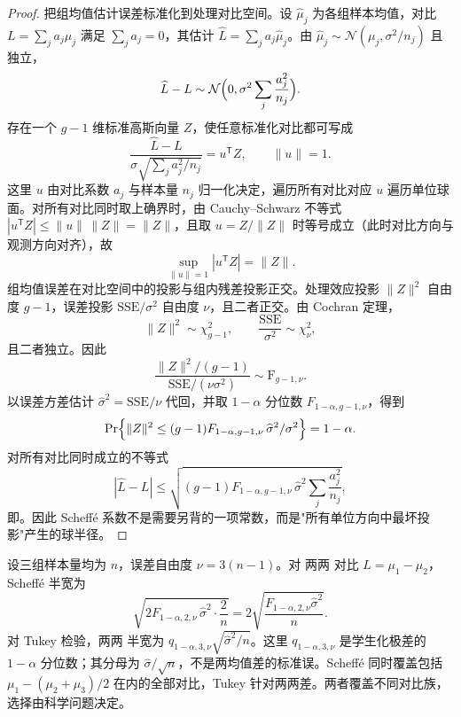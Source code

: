 \begin{proof}
把组均值估计误差标准化到处理对比空间。设 $\widehat\mu_j$ 为各组样本均值，对比 $L=\sum_ja_j\mu_j$ 满足 $\sum_ja_j=0$，其估计 $\widehat L=\sum_ja_j\widehat\mu_j$。由 $\widehat\mu_j\sim\mathcal N(\mu_j,\sigma^2/n_j)$ 且独立，
\begin{equation*}
\widehat L-L\sim\mathcal N\Bigl(0,\sigma^2\sum_j\frac{a_j^2}{n_j}\Bigr).
\end{equation*}
存在一个 $g-1$ 维标准高斯向量 $Z$，使任意标准化对比都可写成
\begin{equation*}
\frac{\widehat L-L}
{\sigma\sqrt{\sum_j a_j^2/n_j}}
=u^{\mathsf T}Z,
\qquad
\|u\|=1.
\end{equation*}
这里 $u$ 由对比系数 $a_j$ 与样本量 $n_j$ 归一化决定，遍历所有对比对应 $u$ 遍历单位球面。对所有对比同时取上确界时，由 Cauchy--Schwarz 不等式 $|u^{\mathsf T}Z|\le\|u\|\,\|Z\|=\|Z\|$，且取 $u=Z/\|Z\|$ 时等号成立（此时对比方向与观测方向对齐），故
\begin{equation*}
\sup_{\|u\|=1}|u^{\mathsf T}Z|
=\|Z\|.
\end{equation*}
组均值误差在对比空间中的投影与组内残差投影正交。处理效应投影 $\|Z\|^2$ 自由度 $g-1$，误差投影 $\mathrm{SSE}/\sigma^2$ 自由度 $\nu$，且二者正交。由 Cochran 定理，
\begin{equation*}
\|Z\|^2\sim\chi^2_{g-1},
\qquad
\frac{\mathrm{SSE}}{\sigma^2}\sim\chi^2_\nu,
\end{equation*}
且二者独立。因此
\begin{equation*}
\frac{\|Z\|^2/(g-1)}{\mathrm{SSE}/(\nu\sigma^2)}
\sim\mathrm F_{g-1,\nu}.
\end{equation*}
以误差方差估计 $\widehat\sigma^2=\mathrm{SSE}/\nu$ 代回，并取 $1-\alpha$ 分位数 $F_{1-\alpha,g-1,\nu}$，得到
\begin{equation*}
\Pr\Bigl\{\|Z\|^2\le(g-1)F_{1-\alpha,g-1,\nu}\,\widehat\sigma^2/\sigma^2\Bigr\}=1-\alpha.
\end{equation*}
对所有对比同时成立的不等式
\begin{equation*}
|\widehat L-L|
\le\sqrt{(g-1)F_{1-\alpha,g-1,\nu}\,\widehat\sigma^2\sum_j\frac{a_j^2}{n_j}},
\end{equation*}
即。因此 Scheffé 系数不是需要另背的一项常数，而是"所有单位方向中最坏投影"产生的球半径。
\end{proof}

\begin{workedexample}
设三组样本量均为 $n$，误差自由度 $\nu=3(n-1)$。对 两两 对比 $L=\mu_1-\mu_2$，Scheffé 半宽为
\[
\sqrt{2F_{1-\alpha,2,\nu}\,\widehat\sigma^2\cdot\frac2n}
=2\sqrt{\frac{F_{1-\alpha,2,\nu}\widehat\sigma^2}{n}}.
\]
对 Tukey 检验，两两 半宽为 $q_{1-\alpha,3,\nu}\sqrt{\widehat\sigma^2/n}$。这里 $q_{1-\alpha,3,\nu}$ 是学生化极差的 $1-\alpha$ 分位数；其分母为 $\widehat\sigma/\sqrt n$，不是两均值差的标准误。Scheffé 同时覆盖包括 $\mu_1-(\mu_2+\mu_3)/2$ 在内的全部对比，Tukey 针对两两差。两者覆盖不同对比族，选择由科学问题决定。
\end{workedexample}

